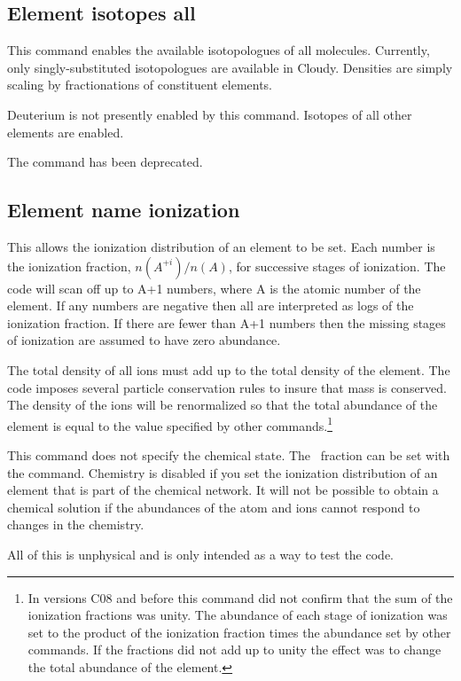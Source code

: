 \subsection{Element isotopes all}

This command enables the available isotopologues of all molecules.
Currently, only singly-substituted isotopologues are available in
Cloudy.
Densities are simply scaling by fractionations of constituent elements.

Deuterium is not presently enabled by this command.
Isotopes of all other elements are enabled.

The command  has been deprecated.

\subsection{Element name ionization }

This allows the ionization distribution of an element to be set.
Each
number is the ionization fraction, $n(A^{+i})/n(A)$,
for successive stages of
ionization.
The code will scan off up to A+1 numbers, where A is the atomic
number of the element.
If any numbers are negative then all are interpreted
as logs of the ionization fraction.
If there are fewer than A+1 numbers
then the missing stages of ionization are assumed to have zero abundance.

The total density of all ions must add up to the total density of the element.
The code imposes several particle conservation rules to insure that
mass is conserved.
The density of the ions will be renormalized so that the
total abundance of the element is equal to the value
specified by other commands.\footnote{In versions C08 and before this
command did not confirm that the sum of the ionization fractions
was unity.  The abundance of each stage of ionization was set to the product
of the ionization fraction times the abundance set by other commands.  If the
fractions did not add up to unity the effect was to change the total
abundance of the element.}

This command does not specify the chemical state.
The \htwo\ fraction can
be set with the  command.
Chemistry is disabled if you set the ionization distribution of an element
that is part of the chemical network.
It will not be possible to obtain
a chemical solution if the abundances of the atom and ions cannot respond
to changes in the chemistry.

All of this is unphysical and is only intended as a way to test the code.

